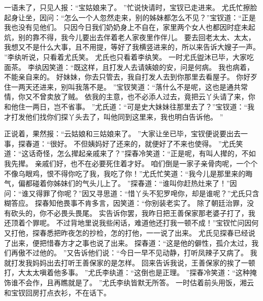 一语未了，只见人报：“宝姑娘来了。
”忙说快请时，宝钗已走进来。
尤氏忙擦脸起身让坐，因问：“怎么一个人忽然走来，别的姊妹都怎么不见？”宝钗道：“正是我也没有见他们。
只因今日我们奶奶身上不自在，家里两个女人也都因时症未起炕，别的靠不得，我今儿要出去伴着老人家夜里作伴儿。
要去回老太太、太太，我想又不是什么大事，且不用提，等好了我横竖进来的，所以来告诉大嫂子一声。
”李纨听说，只看着尤氏笑。
尤氏也只看着李纨笑。
一时尤氏盥沐已毕，大家吃面茶。
李纨因笑道：“既这样，且打发人去请姨娘的安，问是何病。
我也病着，不能亲自来的。
好妹妹，你去只管去，我自打发人去到你那里去看屋子。
你好歹住一两天还进来，别叫我落不是。
”宝钗笑道：“落什么不是呢，这也是通共常情，你又不曾卖放了贼。
依我的主意，也不必添人过去，竟把云丫头请了来，你和他住一两日，岂不省事。
”尤氏道：“可是史大妹妹往那里去了？”宝钗道：“我才打发他们找你们探丫头去了，叫他同到这里来，我也明白告诉他。
”\par
正说着，果然报：“云姑娘和三姑娘来了。
”大家让坐已毕，宝钗便说要出去一事，探春道：“很好。
不但姨妈好了还来的，就便好了不来也使得。
”尤氏笑道：“这话奇怪，怎么撵起亲戚来了？”探春冷笑道：“正是呢，有叫人撵的，不如我先撵。
亲戚们好，也不在必要死住着才好。
咱们倒是一家子亲骨肉呢，一个个不像乌眼鸡，恨不得你吃了我，我吃了你！”尤氏忙笑道：“我今儿是那里来的晦气，偏都碰着你姊妹们的气头儿上了。
”探春道：“谁叫你赶热灶来了！”因问：“谁又得罪了你呢？”因又寻思道：“惜丫头不犯罗唣你，却是谁呢？”尤氏只含糊答应。
探春知他畏事不肯多言，因笑道：“你别装老实了。
除了朝廷治罪，没有砍头的，你不必畏头畏尾。
实告诉你罢，我昨日把王善保家那老婆子打了，我还顶着个罪呢。
不过背地里说我些闲话，难道他还打我一顿不成！”宝钗忙问因何又打他，探春悉把昨夜怎的抄检，怎的打他，一一说了出来。
尤氏见探春已经说了出来，便把惜春方才之事也说了出来。
探春道：“这是他的僻性，孤介太过，我们再傲不过他的。
”又告诉他们说：“今日一早不见动静，打听凤辣子又病了。
我就打发我妈妈出去打听王善保家的是怎样。
回来告诉我说，王善保家的挨了一顿打，大太太嗔着他多事。
”尤氏李纨道：“这倒也是正理。
”探春冷笑道：“这种掩饰谁不会作，且再瞧就是了。
”尤氏李纨皆默无所答。
一时估着前头用饭，湘云和宝钗回房打点衣衫，不在话下。
